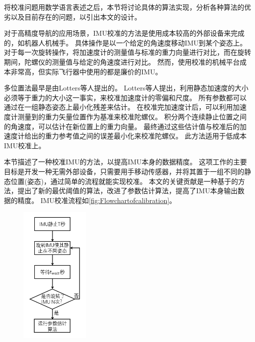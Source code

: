 \documentclass[
  type=master
]{gdutthesis}
\begin{document}
将校准问题用数学语言表述之后，本节将讨论具体的算法实现，分析各种算法的优劣以及目前存在的问题，以引出本文的设计。

对于高精度导航的应用场景，IMU校准的方法是使用成本较高的外部设备来完成的，如机器人机械手。
具体操作是以一个给定的角速度移动IMU到某个姿态上\cite{hall2000case}。
对于每一次旋转操作，将加速度计的测量值与标准的重力向量进行对比，而在旋转期间，陀螺仪的测量值与给定的角速度进行对比。
然而，使用校准的机械平台成本非常高，但实际飞行器中使用的都是廉价的IMU。


多位置法最早是由Lotters等人提出的\cite{lotters1998procedure}。
Lotters等人提出，利用静态加速度的大小必须等于重力的大小这一事实，来校准加速度计的零偏和尺度。
所有参数都可以通过在一组静态姿态上最小化残差来估计。
在校准完加速度计后，可以利用加速度计测量到的重力矢量位置作为基准来校准陀螺仪。
积分两个连续静止位置之间的角速度，可以估计在新位置上的重力向量。
最终通过这些估计值与校准后的加速度计给出的重力参考值之间的误差最小化来校准陀螺仪。
此方法适用于低成本IMU校准上。

本节描述了一种校准IMU的方法，以提高IMU本身的数据精度。
这项工作的主要目标是开发一种无需外部设备，只需要用手移动传感器，并将其置于一组不同的静态位置(姿态)，通过简单的流程就能实现校准。
本文的关键贡献是一种基于\parencite{tedaldi2014robust}的方法，提出了新的最优阈值的算法，改进了参数估计算法，提高了IMU本身输出数据的精度。
IMU校准流程如\autoref{fig:Flowchartofcalibration}。
\begin{figure}[htbp]
	\centering
	\includegraphics[width=0.3\textwidth]{屏幕截图 2022-04-03 100222.png}
	\label{fig:Flowchartofcalibration}
\end{figure}
\end{document}
